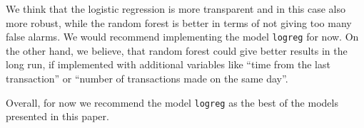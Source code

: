 \documentclass[
]{report}
\begin{document}
We think that the logistic regression is more transparent and in this
case also more robust, while the random forest is better in terms of not
giving too many false alarms. We would recommend implementing the model
\texttt{logreg} for now. On the other hand, we believe, that random
forest could give better results in the long run, if implemented with
additional variables like ``time from the last transaction'' or ``number
of transactions made on the same day''.

Overall, for now we recommend the model \texttt{logreg} as the best of
the models presented in this paper.
\end{document}
